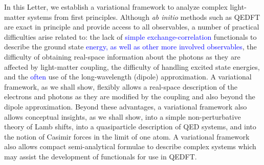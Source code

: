\documentclass[aps,prl,twocolumn,
	groupedaddress,superscriptaddress,
	amsfonts,amssymb,amsmath,floatfix,
	citeautoscript]{revtex4-1}
\newcommand{\Jadd}[1]{\textcolor{blue}{#1}}
\begin{document}
 In this Letter, we establish a variational framework to analyze complex light-matter systems from first principles. Although  \textit{ab initio} methods such as QEDFT are exact in principle and provide access to all observables, a number of practical difficulties arise related to: the lack of \Jadd{simple exchange-correlation} functionals to describe the ground state \Jadd{energy, as well as other more involved observables}, the difficulty of obtaining real-space information about the photons as they are affected by light-matter coupling, the difficulty of handling excited state energies, and the \Jadd{often} use of the long-wavelength (dipole) approximation. A variational framework, as we shall show, flexibly allows a real-space description of the electrons and photons as they are modified by the coupling and also beyond the dipole approximation. Beyond these advantages, a variational framework also allows conceptual insights, as we shall show, into a simple non-perturbative theory of Lamb shifts, into a quasiparticle description of QED systems, and into the notion of Casimir forces in the limit of one atom. A variational framework also allows compact semi-analytical formulae to describe complex systems which may assist the development of functionals for use in QEDFT. 
\end{document}
